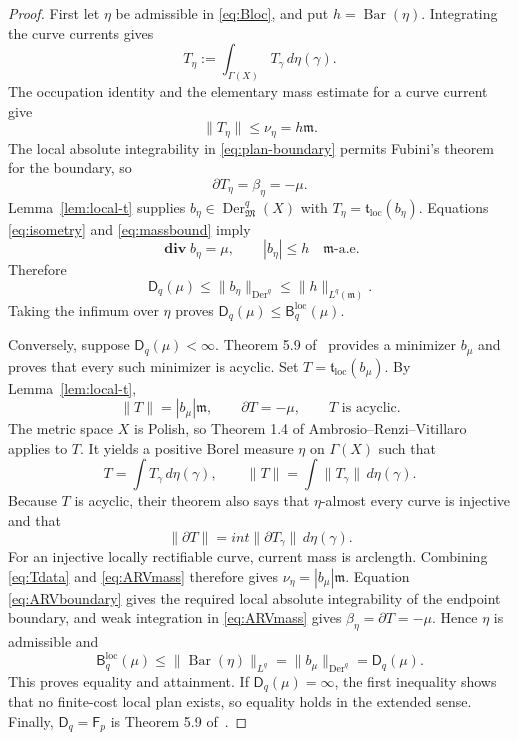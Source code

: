 \documentclass[11pt]{article}
\newcommand{\X}{X}
\newcommand{\m}{\mathfrak m}
\newcommand{\Der}{\operatorname{Der}}
\newcommand{\diver}{\boldsymbol{\operatorname{div}}}
\newcommand{\PlanBar}{\operatorname{Bar}}
\begin{document}
\begin{proof}
First let $\eta$ be admissible in \eqref{eq:Bloc}, and put
$h=\PlanBar(\eta)$.  Integrating the curve currents gives
\[
 T_\eta:=\int_{\Gamma(\X)}T_\gamma\,d\eta(\gamma).
\]
The occupation identity and the elementary mass estimate for a curve current
give
\[
 \|T_\eta\|\leq\nu_\eta=h\m.
 \tag{5.3}\label{eq:massbound}
\]
The local absolute integrability in \eqref{eq:plan-boundary} permits Fubini's
theorem for the boundary, so
\[
 \partial T_\eta=\beta_\eta=-\mu.
\]
Lemma~\ref{lem:local-t} supplies $b_\eta\in\Der^q_{\mathfrak M}(\X)$ with
$T_\eta=\mathfrak t_{\mathrm{loc}}(b_\eta)$.  Equations
\eqref{eq:isometry} and \eqref{eq:massbound} imply
\[
 \diver b_\eta=\mu,
 \qquad |b_\eta|\leq h\quad\m\text{-a.e.}
\]
Therefore
\[
 \mathsf D_q(\mu)\leq\|b_\eta\|_{\Der^q}
 \leq\|h\|_{L^q(\m)}.
\]
Taking the infimum over $\eta$ proves
$\mathsf D_q(\mu)\leq\mathsf B_q^{\mathrm{loc}}(\mu)$.

Conversely, suppose $\mathsf D_q(\mu)<\infty$.  Theorem 5.9 of~\cite{AIKP}
provides a minimizer $b_\mu$ and proves that every such minimizer is acyclic.
Set $T=\mathfrak t_{\mathrm{loc}}(b_\mu)$.  By
Lemma~\ref{lem:local-t},
\[
 \|T\|=|b_\mu|\m,
 \qquad \partial T=-\mu,
 \qquad T\text{ is acyclic}.
 \tag{5.4}\label{eq:Tdata}
\]
The metric space $\X$ is Polish, so Theorem 1.4 of
Ambrosio--Renzi--Vitillaro~\cite{ARV} applies to $T$.  It yields a positive
Borel measure $\eta$ on $\Gamma(\X)$ such that
\[
 T=\int T_\gamma\,d\eta(\gamma),
 \qquad
 \|T\|=\int\|T_\gamma\|\,d\eta(\gamma).
 \tag{5.5}\label{eq:ARVmass}
\]
Because $T$ is acyclic, their theorem also says that $\eta$-almost every
curve is injective and that
\[
 \|\partial T\|=int\|\partial T_\gamma\|\,d\eta(\gamma).
 \tag{5.6}\label{eq:ARVboundary}
\]
For an injective locally rectifiable curve, current mass is arclength.
Combining \eqref{eq:Tdata} and \eqref{eq:ARVmass} therefore gives
$\nu_\eta=|b_\mu|\m$.  Equation \eqref{eq:ARVboundary} gives the required
local absolute integrability of the endpoint boundary, and weak integration
in \eqref{eq:ARVmass} gives
$\beta_\eta=\partial T=-\mu$.  Hence $\eta$ is admissible and
\[
 \mathsf B_q^{\mathrm{loc}}(\mu)
 \leq\|\PlanBar(\eta)\|_{L^q}
 =\|b_\mu\|_{\Der^q}
 =\mathsf D_q(\mu).
\]
This proves equality and attainment.  If $\mathsf D_q(\mu)=\infty$, the first
inequality shows that no finite-cost local plan exists, so equality holds in
the extended sense.  Finally,
$\mathsf D_q=\mathsf F_p$ is Theorem 5.9 of~\cite{AIKP}.
\end{proof}
\end{document}
